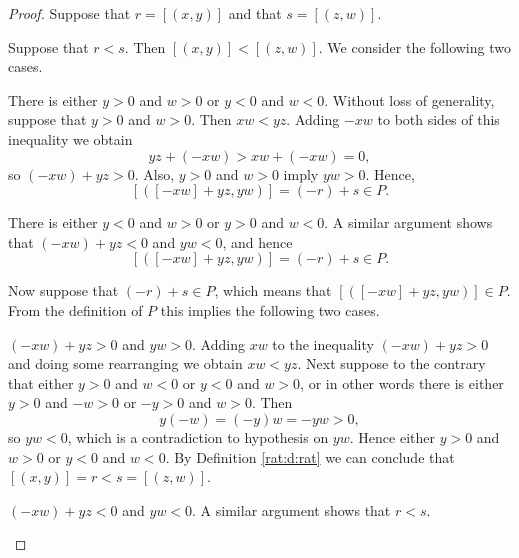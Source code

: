 \begin{proof}
	Suppose that $r = [(x, y)]$ and that $s = [(z, w)]$.

	Suppose that $r < s$. Then $[(x, y)] < [(z, w)]$. We consider the following two cases.
	\begin{bycases}
		\item There is either $y > 0$ and $w > 0$ or $y < 0$ and $w < 0$. Without loss of generality, suppose that $y > 0$ and $w > 0$. Then $x w < y z$. Adding $-x w$ to both sides of this inequality we obtain
		      $$
			      y z + (-x w) > x w + (-x w) = 0,
		      $$
		      so $(-x w) + y z > 0$. Also, $y > 0$ and $w > 0$ imply $y w > 0$. Hence,
		      $$
			      [([-x w] + y z, y w)] = (-r) + s \in P.
		      $$
		\item There is either $y < 0$ and $w > 0$ or $y > 0$ and $w < 0$. A similar argument shows that $(-x w) + yz < 0$ and $y w < 0$, and hence
		      $$
			      [([-x w] + y z, y w)] = (-r) + s \in P.
		      $$
	\end{bycases}

	Now suppose that $(-r) + s \in P$, which means that $[([-x w] + y z, y w)] \in P$. From the definition of $P$ this implies the following two cases.
	\begin{bycases}
		\item $(-x w) + y z > 0$ and $y w > 0$. Adding $x w$ to the inequality $(-x w) + y z > 0$ and doing some rearranging we obtain $x w < y z$. Next suppose to the contrary that either $y > 0$ and $w < 0$ or $y < 0$ and $w > 0$, or in other words there is either $y > 0$ and $-w > 0$ or $-y > 0$ and $w > 0$. Then
		      $$
			      y(-w) = (-y)w = -yw > 0,
		      $$
		      so $y w < 0$, which is a contradiction to hypothesis on $y w$. Hence either $y > 0$ and $w > 0$ or $y < 0$ and $w < 0$. By Definition \ref{rat:d:rat} we can conclude that $[(x, y)] = r < s = [(z, w)]$.
		\item $(-x w) + y z < 0$ and $y w < 0$. A similar argument shows that $r < s$.
	\end{bycases}


\end{proof}
